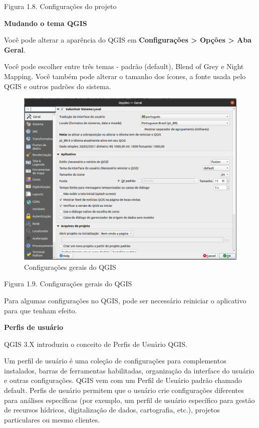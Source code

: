 \documentclass[
]{krantz}
\begin{document}
Figura 1.8. Configurações do projeto

\textbf{Mudando o tema QGIS}

Você pode alterar a aparência do QGIS em \textbf{Configurações \textgreater{} Opções \textgreater{} Aba Geral}.

Você pode escolher entre três temas - padrão (default), Blend of Grey e Night Mapping. Você também pode alterar o tamanho dos ícones, a fonte usada pelo QGIS e outros padrões do sistema.

\begin{figure}
\centering
\includegraphics{media/modulo1/change-theme.png}
\caption{Configurações gerais do QGIS}
\end{figure}

Figura 1.9. Configurações gerais do QGIS

Para algumas configurações no QGIS, pode ser necessário reiniciar o aplicativo para que tenham efeito.

\textbf{Perfis de usuário}

QGIS 3.X introduziu o conceito de Perfis de Usuário QGIS.

Um perfil de usuário é uma coleção de configurações para complementos instalados, barras de ferramentas habilitadas, organização da interface do usuário e outras configurações. QGIS vem com um Perfil de Usuário padrão chamado default. Perfis de usuário permitem que o usuário crie configurações diferentes para análises específicas (por exemplo, um perfil de usuário específico para gestão de recursos hídricos, digitalização de dados, cartografia, etc.), projetos particulares ou mesmo clientes.
\end{document}
